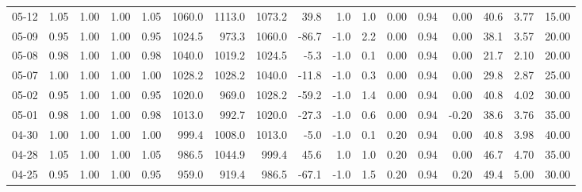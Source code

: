 \begin{threeparttable}
{\begin{tabular}{lrrrrrrrrrrrrrrrr}
  05-12 &         1.05 &           1.00 &          1.00 &          1.05 & 1060.0 & 1113.0 & 1073.2 &       39.8 &                      1.0 &                 1.0 &       0.00 &      0.94 &           0.00 &             40.6 &            3.77 &                  15.00 \\
  05-09 &         0.95 &           1.00 &          1.00 &          0.95 & 1024.5 &  973.3 & 1060.0 &      -86.7 &                     -1.0 &                 2.2 &       0.00 &      0.94 &           0.00 &             38.1 &            3.57 &                  20.00 \\
  05-08 &         0.98 &           1.00 &          1.00 &          0.98 & 1040.0 & 1019.2 & 1024.5 &       -5.3 &                     -1.0 &                 0.1 &       0.00 &      0.94 &           0.00 &             21.7 &            2.10 &                  20.00 \\
  05-07 &         1.00 &           1.00 &          1.00 &          1.00 & 1028.2 & 1028.2 & 1040.0 &      -11.8 &                     -1.0 &                 0.3 &       0.00 &      0.94 &           0.00 &             29.8 &            2.87 &                  25.00 \\
  05-02 &         0.95 &           1.00 &          1.00 &          0.95 & 1020.0 &  969.0 & 1028.2 &      -59.2 &                     -1.0 &                 1.4 &       0.00 &      0.94 &           0.00 &             40.8 &            4.02 &                  30.00 \\
  05-01 &         0.98 &           1.00 &          1.00 &          0.98 & 1013.0 &  992.7 & 1020.0 &      -27.3 &                     -1.0 &                 0.6 &       0.00 &      0.94 &          -0.20 &             38.6 &            3.76 &                  35.00 \\
  04-30 &         1.00 &           1.00 &          1.00 &          1.00 &  999.4 & 1008.0 & 1013.0 &       -5.0 &                     -1.0 &                 0.1 &       0.20 &      0.94 &           0.00 &             40.8 &            3.98 &                  40.00 \\
  04-28 &         1.05 &           1.00 &          1.00 &          1.05 &  986.5 & 1044.9 &  999.4 &       45.6 &                      1.0 &                 1.0 &       0.20 &      0.94 &           0.00 &             46.7 &            4.70 &                  35.00 \\
  04-25 &         0.95 &           1.00 &          1.00 &          0.95 &  959.0 &  919.4 &  986.5 &      -67.1 &                     -1.0 &                 1.5 &       0.20 &      0.94 &           0.20 &             49.4 &            5.00 &                  30.00 \\

\end{tabular}}
\end{threeparttable}
